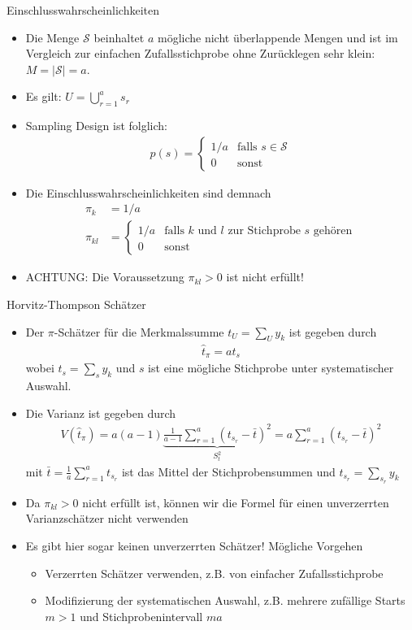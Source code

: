 \documentclass[9pt]{beamer}
\begin{document}
\begin{frame}{Einschlusswahrscheinlichkeiten}
\begin{itemize}
	\item Die Menge $\mathcal{S}$ beinhaltet $a$ mögliche nicht überlappende Mengen und ist im Vergleich zur einfachen Zufallsstichprobe ohne Zurücklegen sehr klein: $M=|\mathcal{S}|=a$. 
	\item Es gilt: $U = \bigcup_{r=1}^a s_r$
	\item Sampling Design ist folglich:
	\begin{align*}
	p(s) = \begin{cases}
	1/a & \text{falls } s\in \mathcal{S}\\
	0 & \text{sonst}
	\end{cases}
	\end{align*}
	\item Die Einschlusswahrscheinlichkeiten sind demnach
	\begin{align*}
	\pi_k &= 1/a\\
	\pi_{kl} &= \begin{cases}
	1/a & \text{falls $k$ und $l$ zur Stichprobe $s$ gehören} \\
	0   & \text{sonst}
	\end{cases}
	\end{align*}
	\item ACHTUNG: Die Voraussetzung $\pi_{kl} >0$ ist nicht erfüllt!
\end{itemize}
\end{frame}

\begin{frame}{Horvitz-Thompson Schätzer}
\begin{itemize}
	\item Der $\pi$-Schätzer für die Merkmalssumme $t_U = \sum_U y_k$ ist gegeben durch
	\begin{align*}
	\hat{t}_\pi = a t_s
	\end{align*}
	wobei $t_s = \sum_s y_k$ und $s$ ist eine mögliche Stichprobe unter systematischer Auswahl.
	\item Die Varianz ist gegeben durch
	\begin{align*}
	V(\hat{t}_\pi) =  a (a-1) \underbrace{\frac{1}{a-1}\sum_{r=1}^a (t_{s_r}-\bar{t})^2}_{S_t^2} =  a \sum_{r=1}^a (t_{s_r}-\bar{t})^2
	\end{align*}
	mit $\bar{t}=\frac{1}{a}\sum_{r=1}^a t_{s_r}$ ist das Mittel der Stichprobensummen und $t_{s_r}=\sum_{s_r} y_k$
	\item Da $\pi_{kl}>0$ nicht erfüllt ist, können wir die Formel für einen unverzerrten Varianzschätzer nicht verwenden
	\item Es gibt hier sogar keinen unverzerrten Schätzer! Mögliche Vorgehen
	\begin{itemize}
		\item Verzerrten Schätzer verwenden, z.B. von einfacher Zufallsstichprobe
		\item Modifizierung der systematischen Auswahl, z.B. mehrere zufällige Starts $m>1$ und Stichprobenintervall $ma$
	\end{itemize}
\end{itemize}
\end{frame}
\end{document}
